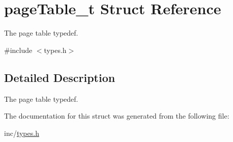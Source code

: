 \hypertarget{structpage_table__t}{
\section{pageTable\_\-t Struct Reference}
\label{structpage_table__t}
}


The page table typedef.  




{\ttfamily \#include $<$types.h$>$}



\subsection{Detailed Description}
The page table typedef. 

The documentation for this struct was generated from the following file:\begin{DoxyCompactItemize}
\item 
inc/\hyperlink{types_8h}{types.h}\end{DoxyCompactItemize}
